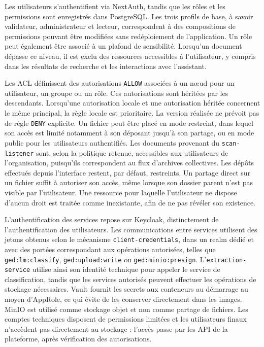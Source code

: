 Les utilisateurs s'authentifient via NextAuth, tandis que les rôles et les permissions sont enregistrés dans PostgreSQL. Les trois profils de base, à savoir validateur, administrateur et lecteur, correspondent à des compositions de permissions pouvant être modifiées sans redéploiement de l'application. Un rôle peut également être associé à un plafond de sensibilité. Lorsqu'un document dépasse ce niveau, il est exclu des ressources accessibles à l'utilisateur, y compris dans les résultats de recherche et les interactions avec l'assistant.

Les ACL définissent des autorisations \texttt{ALLOW} associées à un nœud pour un utilisateur, un groupe ou un rôle. Ces autorisations sont héritées par les descendants. Lorsqu'une autorisation locale et une autorisation héritée concernent le même principal, la règle locale est prioritaire. La version réalisée ne prévoit pas de règle \texttt{DENY} explicite. Un fichier peut être placé en mode restreint, dans lequel son accès est limité notamment à son déposant jusqu'à son partage, ou en mode public pour les utilisateurs authentifiés. Les documents provenant du \texttt{scan-listener} sont, selon la politique retenue, accessibles aux utilisateurs de l'organisation, puisqu'ils correspondent au flux d'archives collectives. Les dépôts effectués depuis l'interface restent, par défaut, restreints. Un partage direct sur un fichier suffit à autoriser son accès, même lorsque son dossier parent n'est pas visible par l'utilisateur. Une ressource pour laquelle l'utilisateur ne dispose d'aucun droit est traitée comme inexistante, afin de ne pas révéler son existence.

L'authentification des services repose sur Keycloak, distinctement de l'authentification des utilisateurs. Les communications entre services utilisent des jetons obtenus selon le mécanisme \texttt{client-credentials}, dans un realm dédié et avec des portées correspondant aux opérations autorisées, telles que \texttt{ged:lm:classify}, \texttt{ged:upload:write} ou \texttt{ged:minio:presign}. L'\texttt{extraction-service} utilise ainsi son identité technique pour appeler le service de classification, tandis que les services autorisés peuvent effectuer les opérations de stockage nécessaires. Vault fournit les secrets aux conteneurs au démarrage au moyen d'AppRole, ce qui évite de les conserver directement dans les images. MinIO est utilisé comme stockage objet et non comme partage de fichiers. Les comptes techniques disposent de permissions limitées et les utilisateurs finaux n'accèdent pas directement au stockage : l'accès passe par les API de la plateforme, après vérification des autorisations.

